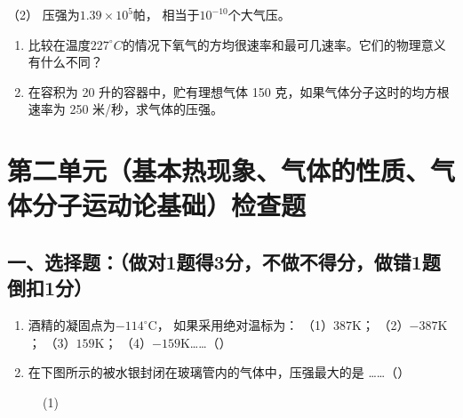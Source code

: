 （2） 压强为\(1.39 \times 10^{5}\)帕， 相当于\(10^{-10}\)个大气压。

\begin{enumerate}
\def\labelenumi{\arabic{enumi}.}
\setcounter{enumi}{8}
\item
  比较在温度\(227^{\circ}C\)的情况下氧气的方均很速率和最可几速率。它们的物理意义有什么不同？
\item
  在容积为 20 升的容器中，贮有理想气体 150
  克，如果气体分子这时的均方根速率为 250 米/秒，求气体的压强。
\end{enumerate}

\chapter{第二单元（基本热现象、气体的性质、气体分子运动论基础）检查题}\label{ux7b2cux4e8cux5355ux5143ux57faux672cux70edux73b0ux8c61ux6c14ux4f53ux7684ux6027ux8d28ux6c14ux4f53ux5206ux5b50ux8fd0ux52a8ux8bbaux57faux7840ux68c0ux67e5ux9898}

\section{一、选择题：（做对1题得3分，不做不得分，做错1题倒扣1分）}\label{ux4e00ux9009ux62e9ux9898ux505aux5bf91ux9898ux5f973ux5206ux4e0dux505aux4e0dux5f97ux5206ux505aux95191ux9898ux5012ux62631ux5206-1}

\begin{enumerate}
\def\labelenumi{\arabic{enumi}.}
\item
  酒精的凝固点为\(-114^{\circ}\mathrm{C}\)， 如果采用绝对温标为：
  （1）\(387\mathrm{K}\)； （2）\(-387\mathrm{K}\)；
  （3）\(159\mathrm{K}\)； （4）\(-159\mathrm{K}\)\ldots\ldots（）
\item
  在下图所示的被水银封闭在玻璃管内的气体中，压强最大的是
  \ldots\ldots（）
\end{enumerate}

\begin{figure}
\centering
{}
\caption{(1)}
\end{figure}

